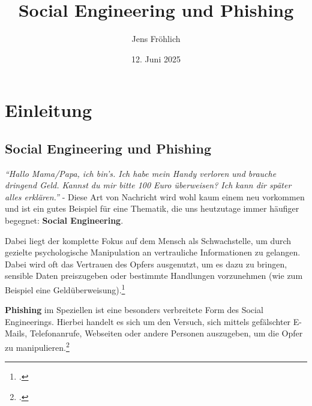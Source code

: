 \documentclass[12pt, a4paper, oneside]{scrartcl}
\title{Social Engineering und Phishing}
\author{Jens Fröhlich}
\date{12. Juni 2025}
\begin{document}

\begin{titlepage}
    \thispagestyle{empty}
    \maketitle
    \vspace{2cm}
    \begin{center}
    \end{center}
\end{titlepage}


\clearpage
\pagestyle{empty}
\tableofcontents


\justify


\pagestyle{scrheadings}
\clearpairofpagestyles

\ihead{}
\chead{}
\ohead{}

\ifoot{}
\cfoot[\pagemark]{\pagemark}
\ofoot{}

\setcounter{page}{2}

\section{Einleitung}

\subsection{Social Engineering und Phishing}
\textit{``Hallo Mama/Papa, ich bin's. Ich habe mein Handy verloren und 
brauche dringend Geld. Kannst du mir bitte 100 Euro überweisen? 
Ich kann dir später alles erklären.''} - Diese Art von Nachricht wird wohl kaum einem
neu vorkommen und ist ein gutes Beispiel für eine Thematik, die uns heutzutage immer häufiger begegnet:
\textbf{Social Engineering}.
\par
Dabei liegt der komplette Fokus auf dem Mensch als Schwachstelle, um durch gezielte psychologische
Manipulation an vertrauliche Informationen zu gelangen. Dabei wird oft das Vertrauen des Opfers ausgenutzt, 
um es dazu zu bringen, sensible Daten preiszugeben oder bestimmte Handlungen vorzunehmen (wie zum Beispiel
eine Geldüberweisung).\footcite{BSISocialEngineering}
\par
\textbf{Phishing} im Speziellen ist eine besonders verbreitete Form des Social Engineerings. 
Hierbei handelt es sich um den Versuch, sich mittels gefälschter E-Mails, Telefonanrufe, Webseiten 
oder andere Personen auszugeben, um die Opfer zu manipulieren.\footcite{BSIPhishing}\\
\end{document}
